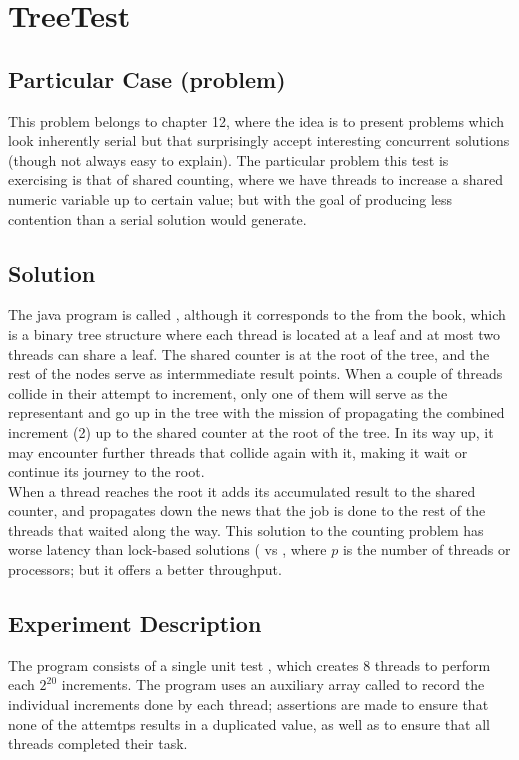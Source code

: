 \section{\textbf{TreeTest}}

\subsection{Particular Case (problem)}
This problem belongs to chapter 12, where the idea is to present
problems which look inherently serial but that surprisingly accept
interesting concurrent solutions (though not always easy to
explain). The particular problem this test is exercising is that of
shared 
counting, where we have  threads to increase a shared numeric
variable up to certain value; but with the goal of producing less
contention than a serial solution would generate. 

\subsection{Solution}

The java program is called , although it corresponds to  
the  from the book, which is a binary tree structure
where each thread is located at a leaf and at most two threads can
share a leaf. The shared counter is at the root of the tree, and the
rest of the nodes serve as intermmediate result points. When a couple
of threads collide in their attempt to increment, only one of them
will serve as the representant and go up in the tree with the mission
of propagating the combined increment (2) up to the shared counter at
the root of the tree. In its way up, it may encounter further threads
that collide again with it, making it wait or continue its journey to
the root. \\

When a thread reaches the root it adds its accumulated result to the
shared counter, and propagates down the news that the job is done to
the rest of the threads that waited along the way. This
solution to the counting problem has worse latency than lock-based
solutions ( vs , where $p$ is the number of
threads or processors; but it offers a better throughput. 

\subsection{Experiment Description}

The program consists of a single unit test ,
which creates 8 threads to perform each $2^20$ increments. The program
uses an auxiliary array called  to record the individual
increments done by each thread; assertions are made to ensure that
none of the attemtps results in a duplicated value, as well as to
ensure that all threads completed their task.

